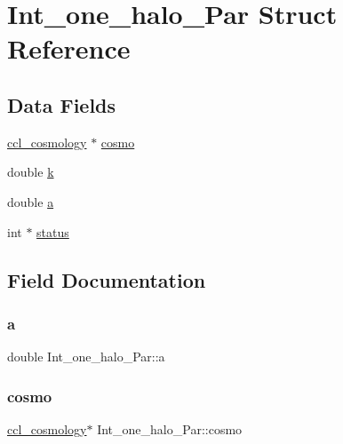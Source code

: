 \hypertarget{struct_int__one__halo___par}{}\section{Int\+\_\+one\+\_\+halo\+\_\+\+Par Struct Reference}
\label{struct_int__one__halo___par}
\subsection*{Data Fields}
\begin{DoxyCompactItemize}
\item 
\mbox{\hyperlink{structccl__cosmology}{ccl\+\_\+cosmology}} $\ast$ \mbox{\hyperlink{struct_int__one__halo___par_af4699fc16df8c5f87900aca4e9099f87}{cosmo}}
\item 
double \mbox{\hyperlink{struct_int__one__halo___par_af89043e1db4499de46076188d7de7db5}{k}}
\item 
double \mbox{\hyperlink{struct_int__one__halo___par_a23af468385a7645030d646f4874dc72c}{a}}
\item 
int $\ast$ \mbox{\hyperlink{struct_int__one__halo___par_ac2929000623f3dfd983b5bab45d02a8c}{status}}
\end{DoxyCompactItemize}


\subsection{Field Documentation}
\mbox{\label{struct_int__one__halo___par_a23af468385a7645030d646f4874dc72c}} 
\subsubsection{\texorpdfstring{a}{a}}
{\footnotesize\ttfamily double Int\+\_\+one\+\_\+halo\+\_\+\+Par\+::a}

\mbox{\label{struct_int__one__halo___par_af4699fc16df8c5f87900aca4e9099f87}} 
\subsubsection{\texorpdfstring{cosmo}{cosmo}}
{\footnotesize\ttfamily \mbox{\hyperlink{structccl__cosmology}{ccl\+\_\+cosmology}}$\ast$ Int\+\_\+one\+\_\+halo\+\_\+\+Par\+::cosmo}


